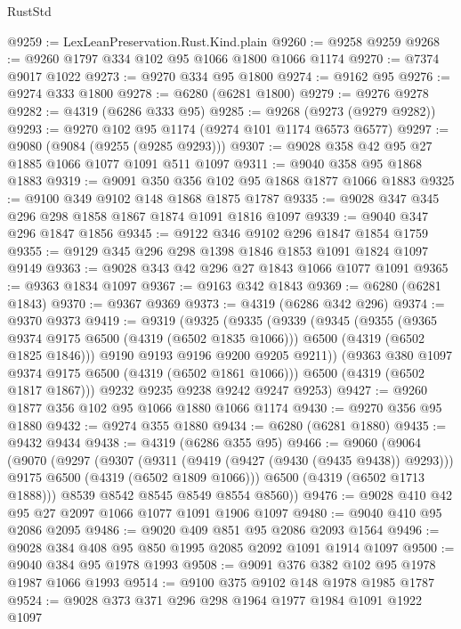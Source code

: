 \begin{lexlean}{RustStd}
\begin{coremodule}
@9259 := LexLeanPreservation.Rust.Kind.plain
@9260 := @9258 @9259
@9268 := @9260 @1797 @334 @102 @95 @1066 @1800 @1066 @1174
@9270 := @7374 @9017 @1022
@9273 := @9270 @334 @95 @1800
@9274 := @9162 @95
@9276 := @9274 @333 @1800
@9278 := @6280 (@6281 @1800)
@9279 := @9276 @9278
@9282 := @4319 (@6286 @333 @95)
@9285 := @9268 (@9273 (@9279 @9282))
@9293 := @9270 @102 @95 @1174 (@9274 @101 @1174 @6573 @6577)
@9297 := @9080 (@9084 (@9255 (@9285 @9293)))
@9307 := @9028 @358 @42 @95 @27 @1885 @1066 @1077 @1091 @511 @1097
@9311 := @9040 @358 @95 @1868 @1883
@9319 := @9091 @350 @356 @102 @95 @1868 @1877 @1066 @1883
@9325 := @9100 @349 @9102 @148 @1868 @1875 @1787
@9335 := @9028 @347 @345 @296 @298 @1858 @1867 @1874 @1091 @1816 @1097
@9339 := @9040 @347 @296 @1847 @1856
@9345 := @9122 @346 @9102 @296 @1847 @1854 @1759
@9355 := @9129 @345 @296 @298 @1398 @1846 @1853 @1091 @1824 @1097 @9149
@9363 := @9028 @343 @42 @296 @27 @1843 @1066 @1077 @1091
@9365 := @9363 @1834 @1097
@9367 := @9163 @342 @1843
@9369 := @6280 (@6281 @1843)
@9370 := @9367 @9369
@9373 := @4319 (@6286 @342 @296)
@9374 := @9370 @9373
@9419 := @9319
    (@9325
      (@9335
        (@9339
          (@9345
            (@9355
              (@9365 @9374 @9175 @6500 (@4319 (@6502 @1835 @1066)))
              @6500
              (@4319 (@6502 @1825 @1846)))
            @9190
            @9193
            @9196
            @9200
            @9205
            @9211))
        (@9363 @380 @1097 @9374 @9175 @6500 (@4319 (@6502 @1861 @1066)))
        @6500
        (@4319 (@6502 @1817 @1867)))
      @9232
      @9235
      @9238
      @9242
      @9247
      @9253)
@9427 := @9260 @1877 @356 @102 @95 @1066 @1880 @1066 @1174
@9430 := @9270 @356 @95 @1880
@9432 := @9274 @355 @1880
@9434 := @6280 (@6281 @1880)
@9435 := @9432 @9434
@9438 := @4319 (@6286 @355 @95)
@9466 := @9060
    (@9064
      (@9070
        (@9297
          (@9307
            (@9311 (@9419 (@9427 (@9430 (@9435 @9438)) @9293)))
            @9175
            @6500
            (@4319 (@6502 @1809 @1066)))
          @6500
          (@4319 (@6502 @1713 @1888)))
        @8539
        @8542
        @8545
        @8549
        @8554
        @8560))
@9476 := @9028 @410 @42 @95 @27 @2097 @1066 @1077 @1091 @1906 @1097
@9480 := @9040 @410 @95 @2086 @2095
@9486 := @9020 @409 @851 @95 @2086 @2093 @1564
@9496 := @9028 @384 @408 @95 @850 @1995 @2085 @2092 @1091 @1914 @1097
@9500 := @9040 @384 @95 @1978 @1993
@9508 := @9091 @376 @382 @102 @95 @1978 @1987 @1066 @1993
@9514 := @9100 @375 @9102 @148 @1978 @1985 @1787
@9524 := @9028 @373 @371 @296 @298 @1964 @1977 @1984 @1091 @1922 @1097

\end{coremodule}
\end{lexlean}
